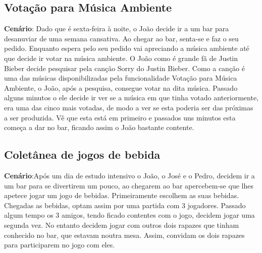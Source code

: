 \documentclass{article}
\begin{document}
\subsection*{Votação para Música Ambiente}
\textbf{Cenário}: Dado que é sexta-feira à noite, o João decide ir a um bar para desanuviar de uma semana cansativa. Ao chegar ao bar, senta-se e faz o seu pedido. Enquanto espera pelo seu pedido vai apreciando a música ambiente até que decide ir votar na música ambiente. O João como é grande fã de Justin Bieber decide pesquisar pela canção Sorry do Justin Bieber. Como a canção é uma das músicas disponibilizadas pela funcionalidade Votação para Música Ambiente, o João, após a pesquisa, consegue votar na dita música. Passado alguns minutos o ele decide ir ver se a música em que tinha votado anteriormente, era uma das cinco mais votadas, de modo a ver se esta poderia ser das próximas a ser produzida. Vê que esta está em primeiro e passados uns minutos esta começa a dar no bar, ficando assim o João bastante contente. 

\subsection*{Coletânea de jogos de bebida}
\textbf{Cenário}:Após um dia de estudo intensivo o João, o José e o Pedro, decidem ir a um bar para se divertirem um pouco, ao chegarem ao bar apercebem-se que lhes apetece jogar um jogo de bebidas. Primeiramente escolhem as suas bebidas. Chegadas as bebidas, optam assim por uma partida com 3 jogadores. 
Passado algum tempo os 3 amigos, tendo ficado contentes com o jogo, decidem jogar uma segunda vez. No entanto decidem jogar com outros dois rapazes que tinham conhecido no bar, que estavam noutra mesa. Assim, convidam os dois rapazes para participarem no jogo com eles. 
\end{document}
